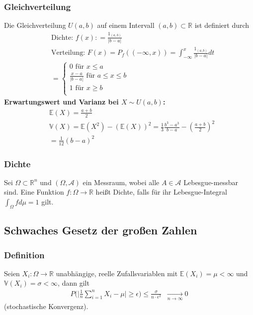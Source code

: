 \documentclass[a4paper]{article}
\begin{document}
\subsubsection{Gleichverteilung}
Die Gleichverteilung $U{(a,b)}$ auf einem Intervall $(a,b) \subset \mathbb{R}$ ist definiert durch
\begin{align*}
& \text{Dichte: } f (x) : = \frac{1_{(a,b)}}{|b-a| } \\
& \text{Verteilung: } F (x) =  P_f( (-\infty, x))  =  \int_{-\infty}^{x} \frac{1_{(a,b)}}{|b-a|} dt\\\
& = \begin {cases} 0 \text{ für } x \leq a \\   \frac{x-a}{|b-a|} \text{ für } a \leq x \leq b \\ 1 \text{ für }  x \geq b \\  \end{cases}
\end{align*}
\textbf{Erwartungswert und Varianz bei $X \sim U(a,b)$:}
\begin{align*}
& \mathbb{E}(X) = \frac{a+b}2 \\
& \mathbb{V}(X) = \mathbb{E}(X^2) - \left({\mathbb{E}(X)} \right)^2  = \frac{1}{3}\frac{b^3  - a^3}{b - a} - \left( {\frac{a + b}{2}} \right)^2 \\
    &= \frac{1}{12}(b - a)^2
\end{align*}

\subsubsection{Dichte}
Sei $\Omega \subset \mathbb{R}^n$ und $(\Omega, \mathcal{A})$ ein Messraum, wobei alle $A \in \mathcal{A}$ Lebesgue-messbar sind.
 Eine Funktion $f: \Omega \to \mathbb{R}$ heißt Dichte, falls für ihr Lebesgue-Integral $\int_{\Omega} f d \mu = 1$ gilt.


\subsection{Schwaches Gesetz der großen Zahlen}

\subsubsection{Definition}
Seien $X_i : \Omega \to \mathbb{R}$ unabhängige, reelle Zufallsvariablen mit $\mathbb{E}(X_i) = \mu < \infty$ und $\mathbb{V}(X_i) = \sigma < \infty$, dann gilt
\begin{align*}
P \bigl  ( \bigl | \frac{1}{n} \sum_{i=1}^{n} X_i - \mu \bigr |  \geq \epsilon \bigr) \leq \frac{\sigma}{ n \cdot \epsilon^2} \; \; \underset{n \to \infty}{\longrightarrow} 0
\end{align*}
(stochastische Konvergenz). 
\end{document}

